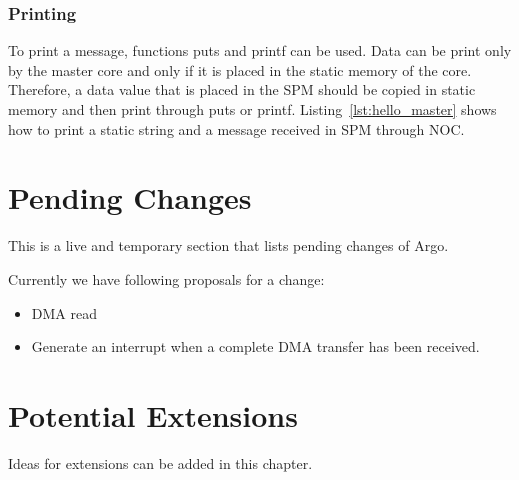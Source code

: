 \documentclass[a4paper,fontsize=10pt,twoside,DIV15,BCOR12mm,headinclude=true,footinclude=false,pagesize,bibtotoc]{scrbook}
\begin{document}
\subsection{Printing}
To print a message, functions puts and printf can be used. Data can be print only
by the master core and only if it is placed in the static memory of the core. Therefore,
a data value that is placed in the SPM should be copied in static memory 
and then print through puts or printf. Listing~\ref{lst:hello_master}
shows how to print a static string and a message received in SPM through NOC.


\chapter{Pending Changes}

This is a live and temporary section that lists pending changes of Argo.

Currently we have following proposals for a change:

\begin{itemize}
\item DMA read
\item Generate an interrupt when a complete DMA transfer has been received. 
\end{itemize}

\chapter{Potential Extensions}
\label{chap:ext}
Ideas for extensions can be added in this chapter.





\end{document}
